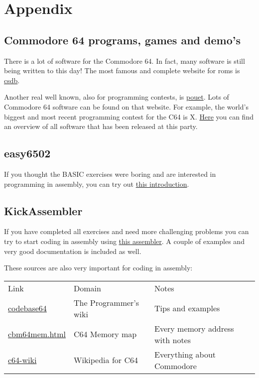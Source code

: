 \documentclass{article}
\newcounter{problem}
\begin{document}
\section{Appendix}

\subsection{Commodore 64 programs, games and demo's}

There is a lot of software for the Commodore 64.
In fact, many software is still being written to this day!
The most famous and complete website for roms is \href{http://csdb.dk}{csdb}.

Another real well known, also for programming contests, is \href{https://www.pouet.net}{pouet}.
Lots of Commodore 64 software can be found on that website.
For example, the world's biggest and most recent programming contest for the C64 is X.
\href{https://www.pouet.net/party.php?which=50&when=2016}{Here} you can find an overview of all software that has been released at this party.

\subsection{easy6502}

If you thought the BASIC exercises were boring and are interested in programming in assembly, you can try out \href{https://skilldrick.github.io/easy6502/}{this introduction}.

\subsection{KickAssembler}

If you have completed all exercises and need more challenging problems you can try to start coding in assembly using \href{http://theweb.dk/KickAssembler/Main.html#frontpage}{this assembler}.
A couple of examples and very good documentation is included as well.

These sources are also very important for coding in assembly:

\begin{tabular}{l|l|l}
Link & Domain & Notes \\
\href{http://codebase64.org}{codebase64} & The Programmer's wiki & Tips and examples \\
\href{http://sta.c64.org/cbm64mem.html}{cbm64mem.html} & C64 Memory map & Every memory address with notes \\
\href{https://www.c64-wiki.com}{c64-wiki} & Wikipedia for C64 & Everything about Commodore \\
\end{tabular}
\end{document}
